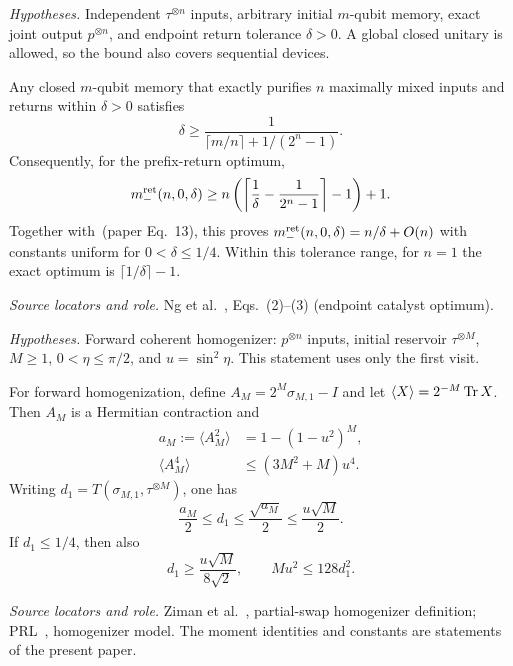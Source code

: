 \documentclass[11pt]{article}
\begin{document}
\par\medskip
\noindent\begin{minipage}{\linewidth}
\emph{Hypotheses.} Independent $\tau^{\otimes n}$ inputs, arbitrary initial $m$-qubit memory, exact joint output $p^{\otimes n}$, and endpoint return tolerance $\delta>0$. A global closed unitary is allowed, so the bound also covers sequential devices.

\begin{proposition}
Any closed $m$-qubit memory that exactly purifies $n$ maximally mixed inputs and returns within $\delta>0$ satisfies
\begin{equation}
 \delta\ge\frac1{\lceil m/n\rceil+1/(2^n-1)}.
\end{equation}
Consequently, for the prefix-return optimum,
\begin{equation}
 m_-^{\rm ret}(n,0,\delta)\ge
 n\left(\left\lceil\frac1\delta-\frac1{2^n-1}\right\rceil-1\right)+1.
\end{equation}
Together with~(paper Eq.~13), this proves $m_-^{\rm ret}(n,0,\delta)=n/\delta+O(n)$ with constants uniform for $0<\delta\le1/4$. Within this tolerance range, for $n=1$ the exact optimum is $\lceil1/\delta\rceil-1$.
\end{proposition}

\noindent\emph{Source locators and role.} Ng et al.~\cite{ng}, Eqs.~(2)--(3) (endpoint catalyst optimum).
\end{minipage}
\par

\par\medskip
\noindent\begin{minipage}{\linewidth}
\emph{Hypotheses.} Forward coherent homogenizer: $p^{\otimes n}$ inputs, initial reservoir $\tau^{\otimes M}$, $M\ge1$, $0<\eta\le\pi/2$, and $u=\sin^2\eta$. This statement uses only the first visit.

\begin{theorem}
For forward homogenization, define $A_M=2^M\sigma_{M,1}-I$ and let $\langle X\rangle=2^{-M}\operatorname{Tr} X$. Then $A_M$ is a Hermitian contraction and
\begin{align}
 a_M:=\langle A_M^2\rangle&=1-(1-u^2)^M,\\
 \langle A_M^4\rangle&\le(3M^2+M)u^4.
\end{align}
Writing $d_1=T(\sigma_{M,1},\tau^{\otimes M})$, one has
\begin{equation}
 \frac{a_M}{2}\le d_1\le\frac{\sqrt{a_M}}2\le\frac{u\sqrt M}{2}.
\end{equation}
If $d_1\le1/4$, then also
\begin{equation}
 d_1\ge\frac{u\sqrt M}{8\sqrt2},\qquad Mu^2\le128d_1^2.
\end{equation}
\end{theorem}

\noindent\emph{Source locators and role.} Ziman et al.~\cite{ziman}, partial-swap homogenizer definition; PRL~\cite{prl}, homogenizer model. The moment identities and constants are statements of the present paper.
\end{minipage}
\par
\end{document}
